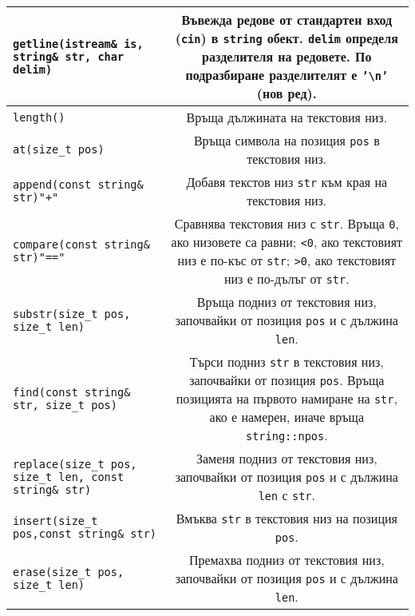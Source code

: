 \documentclass[oneside]{book}
\newcommand*{\code}[1]{\texttt{#1}}
\newcommand*{\bs}{\textbackslash}
\begin{document}
\begin{center}\begin{tabular}{|E|C|}
    \hline
    \code{getline(istream\& is, string\& str, char delim)} & \vspace{3pt}Въвежда редове от стандартен вход (\code{cin}) в \code{string} обект. \code{delim} определя разделителя на редовете. По подразбиране разделителят е \code{'\bs n'} (нов ред).\vspace{3pt}\\\hline
    \code{length()} & \vspace{3pt}Връща дължината на текстовия низ.\vspace{3pt}\\\hline
    \code{at(size\_t pos)} & \vspace{3pt}Връща символа на позиция \code{pos} в текстовия низ.\vspace{3pt}\\\hline
    \code{append(const string\& str)}\hfil \code{"}\code{+"} & \vspace{3pt}Добавя текстов низ \code{str} към края на текстовия низ.\vspace{3pt}\\\hline
    \code{compare(const string\& str)}\hfil \code{"}\code{=="} & \vspace{3pt}Сравнява текстовия низ с \code{str}. Връща \code{0}, ако низовете са равни; \code{<0}, ако текстовият низ е по-къс от \code{str}; \code{>0}, ако текстовият низ е по-дълъг от \code{str}.\vspace{3pt}\\\hline
    \code{substr(size\_t pos, size\_t len)} & \vspace{3pt}Връща подниз от текстовия низ, започвайки от позиция \code{pos} и с дължина \code{len}.\vspace{3pt}\\\hline
    \code{find(const string\& str, size\_t pos)} & \vspace{3pt}Търси подниз \code{str} в текстовия низ, започвайки от позиция \code{pos}. Връща позицията на първото намиране на \code{str}, ако е намерен, иначе връща \code{string::npos}.\vspace{3pt}\\\hline
    \code{replace(size\_t pos, size\_t len, const string\& str)} & \vspace{3pt}Заменя подниз от текстовия низ, започвайки от позиция \code{pos} и с дължина \code{len} с \code{str}.\vspace{3pt}\\\hline
    \code{insert(size\_t pos,\hfil const string\& str)} & \vspace{3pt}Вмъква \code{str} в текстовия низ на позиция \code{pos}.\vspace{3pt}\\\hline
    \code{erase(size\_t pos, size\_t len)} & \vspace{3pt}Премахва подниз от текстовия низ, започвайки от позиция \code{pos} и с дължина \code{len}.\vspace{3pt}\\\hline
\end{tabular}\end{center}
\pagebreak
\end{document}
